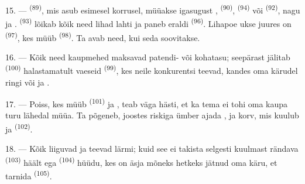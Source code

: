 15. ---  \textsuperscript{(89)}, mis asub esimesel korrusel, müüakse
igasugust ,  \textsuperscript{(90)}, 
\textsuperscript{(94)} või  \textsuperscript{(92)}, nagu
 ja . 
\textsuperscript{(93)} lõikab kõik need lihad lahti ja paneb eraldi 
\textsuperscript{(96)}. Lihapoe ukse juures on 
\textsuperscript{(97)}, kes müüb  \textsuperscript{(98)}. Ta avab need,
kui seda soovitakse.

16. --- Kõik need kaupmehed maksavad patendi- või kohatasu; seepärast jälitab
 \textsuperscript{(100)} halastamatult vaeseid
 \textsuperscript{(99)}, kes neile konkurentsi teevad,
kandes oma kärudel ringi  või
 ja
.

\VUsaut{4.0mm}
\VUsaut{3.0mm}

17. --- Poiss, kes müüb  \textsuperscript{(101)} ja ,
teab väga hästi, et ka tema ei tohi oma kaupa turu lähedal müüa. Ta põgeneb, joostes
riskiga ümber ajada ,  ja  korv, mis
kuulub  ja   \textsuperscript{(102)}.

18. --- Kõik liiguvad ja teevad lärmi; kuid see ei takista selgesti kuulmast
rändava  \textsuperscript{(103)} häält ega 
\textsuperscript{(104)} hüüdu, kes on äsja mõneks hetkeks jätnud oma käru, et tarnida
 \textsuperscript{(105)}.

\VUsaut{6.0mm}
\VUfilet{22mm}

